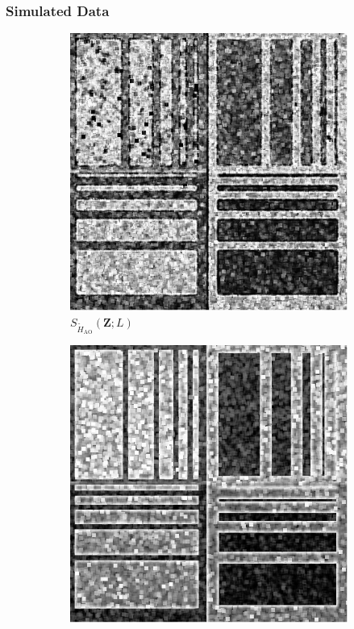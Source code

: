 \documentclass[aspectratio=1610,10pt]{beamer}
\begin{document}
\begin{frame} \frametitle{\large{Simulated Data }}\vspace{-0.1cm}

\begin{figure}[H]
  \centering
  \begin{subfigure}[b]{0.3\textwidth}
    \centering
    \includegraphics[width=\textwidth]{../../Figures/PNG/Entropy_Phantom_4_z1_200}
    \caption{$S_{\widetilde{H}_{\text{AO}}}(\bm{Z}; L)$}
    \label{fig:sim_results-1}
  \end{subfigure}
  \hfill
  \begin{subfigure}[b]{0.3\textwidth}
    \centering
    \includegraphics[width=\textwidth]{../../Figures/PNG/cv_Phantom_4_z1}

\end{subfigure}
\end{figure}
\end{frame}
\end{document}

